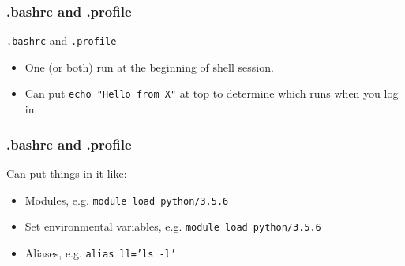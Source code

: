 \documentclass{beamer}
\newcommand{\code}[1]{\colorbox{codegray}{\texttt{#1}}}
\begin{document}
\begin{frame}
\frametitle{.bashrc and .profile}
\code{.bashrc} and \code{.profile}
\bigskip
\begin{itemize}
    \item One (or both) run at the beginning of shell session.
    \bigskip
    \pause
    \item Can put \code{echo "Hello from X"} at top to determine which runs when you log in.
\end{itemize}
\end{frame}


\begin{frame}
\frametitle{.bashrc and .profile}
Can put things in it like:
\bigskip
\begin{itemize}
    \item Modules, e.g. \code{module load python/3.5.6}
    \bigskip
    \pause
    \item Set environmental variables, e.g. \code{module load python/3.5.6}
    \pause
    \bigskip
    \item Aliases, e.g. \code{alias ll='ls -l'}
\end{itemize}
\end{frame}
\end{document}
